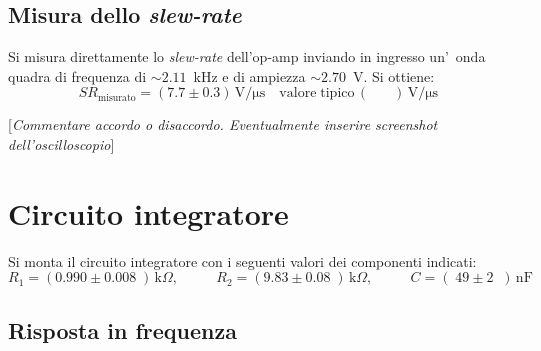 \documentclass[10pt,a4paper]{article}
\newcommand{\rem}[1]{[\emph{#1}]}
\newcommand{\exn}{\phantom{xxx}}
\begin{document}
\subsection{Misura dello \emph{slew-rate}}
Si misura direttamente lo \emph{slew-rate} dell'op-amp inviando in ingresso un'~onda quadra 
di frequenza di $\sim 2.11$~kHz e di ampiezza $\sim 2.70$~V. Si ottiene:
\[
SR_\mathrm{misurato} = (7.7 \pm 0.3 )\,\mathrm{V/\mu s} \quad \mathrm{valore \; tipico}\, (\exn )\,\mathrm{V/\mu s}\
\]

\rem{Commentare accordo o disaccordo. Eventualmente inserire screenshot dell'oscilloscopio}
%
\section{Circuito integratore}
Si monta il circuito integratore con i seguenti valori  dei componenti indicati: 
\[
R_1 = (0.990 \pm  0.008\;) \,\mathrm{k}\Omega, \:\:\;\:\exn 
R_2 = (9.83 \pm 0.08 \;) \,\mathrm{k}\Omega, \:\:\;\:\exn 
C = (\;49 \pm 2 \;\;)\,\mathrm{nF}
\]

\subsection{Risposta in frequenza}
\end{document}
